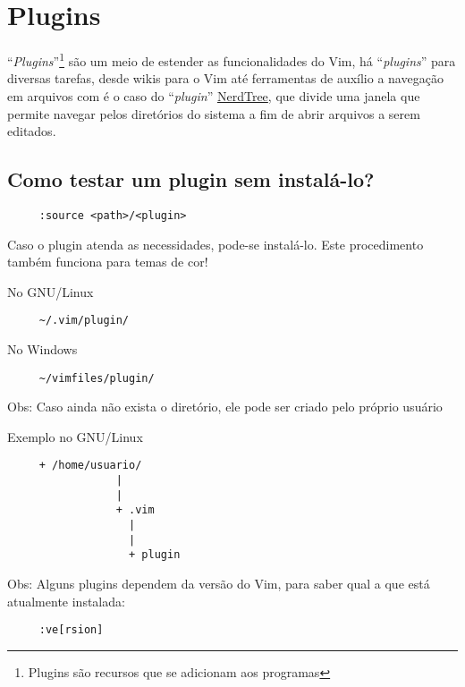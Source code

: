 
\chapter{Plugins}\label{Plugins}
``{\em Plugins}''\footnote{Plugins são recursos que se adicionam aos programas}
são um meio de estender as funcionalidades do Vim, há ``{\em plugins}'' para
diversas tarefas, desde wikis para o Vim até ferramentas de auxílio a navegação
em arquivos com é o caso do ``{\em plugin}''
\href{http://www.vim.org/scripts/script.php?script\_id=1658}{NerdTree}, que
divide uma janela que permite navegar pelos diretórios do sistema a fim de
abrir arquivos a serem editados.

\section{Como testar um plugin sem instalá-lo?}
\label{Como testar um plugin sem instala-lo?}

\begin{verbatim}
     :source <path>/<plugin>
\end{verbatim}

Caso o plugin atenda as necessidades, pode-se instalá-lo. Este
procedimento também funciona para temas de cor!


No GNU/Linux
\begin{verbatim}
     ~/.vim/plugin/
\end{verbatim}

No Windows

\begin{verbatim}
     ~/vimfiles/plugin/
\end{verbatim}

Obs: Caso ainda não exista o diretório, ele pode ser criado pelo próprio usuário

Exemplo no GNU/Linux

\begin{verbatim}
     + /home/usuario/
                 |
                 |
                 + .vim
                   |
                   |
                   + plugin
\end{verbatim}

Obs: Alguns plugins dependem da versão do Vim, para saber qual
a que está atualmente instalada:

\begin{verbatim}
     :ve[rsion]
\end{verbatim}

